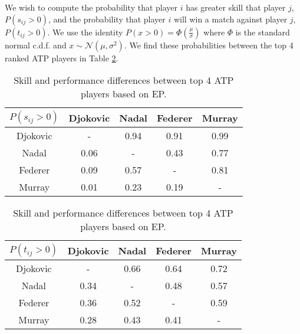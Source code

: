 \documentclass[11pt]{article}
\begin{document}
We wish to compute the probability that player $i$ has greater skill that player $j$, $P(s_{ij}>0)$, and the probability that player $i$ will win a match against player $j$, $P(t_{ij}>0)$. We use the identity $P(x>0) = \Phi(\frac{\mu}{\sigma})$ where $\Phi$ is the standard normal c.d.f. and $x \sim \mathcal{N}(\mu, \sigma^2)$. We find these probabilities between the top 4 ranked ATP players in Table \ref{tbl:B_atp_probabilities}.

\begin{table}
    \centering
    \small
    \setlength{\tabcolsep}{2pt}
    \begin{minipage}{0.49\textwidth}
        \small
        \centering
        \begin{tabular}{|c|c c c c|}
            \hline
            $P(s_{ij}>0)$ & Djokovic & Nadal & Federer & Murray \\
            \hline
            Djokovic & -    & 0.94 & 0.91 & 0.99 \\
            Nadal    & 0.06 & -    & 0.43 & 0.77 \\
            Federer  & 0.09 & 0.57 & -    & 0.81 \\
            Murray   & 0.01 & 0.23 & 0.19 & -    \\
            \hline
        \end{tabular}
        \label{tbl:B_skill_difference}
    \end{minipage}
    \begin{minipage}{0.49\textwidth}
        \small
        \centering
        \begin{tabular}{|c|c c c c|}
            \hline
            $P(t_{ij}>0)$ & Djokovic & Nadal & Federer & Murray \\
            \hline
            Djokovic & -    & 0.66 & 0.64 & 0.72 \\ 
            Nadal    & 0.34 & -    & 0.48 & 0.57 \\ 
            Federer  & 0.36 & 0.52 & -    & 0.59 \\ 
            Murray   & 0.28 & 0.43 & 0.41 & -    \\
            \hline
        \end{tabular}
        \label{tbl:B_performance_difference}
    \end{minipage}
    \caption{Skill and performance differences between top 4 ATP players based on EP.}
    \label{tbl:B_atp_probabilities}
\end{table}
\end{document}
